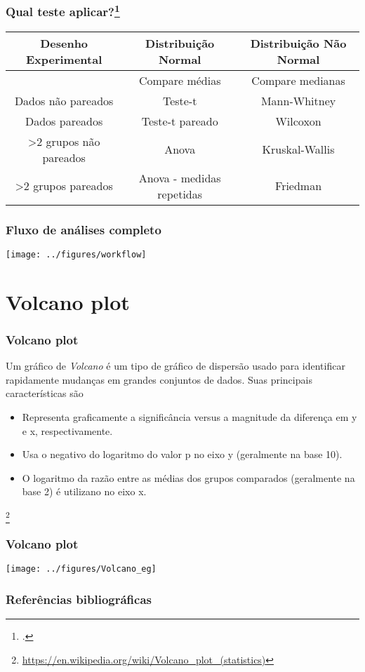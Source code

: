 \documentclass{beamer}
\newcommand\blfootnote[1]{%
  \begingroup
  \renewcommand\thefootnote{}\footnote{#1}%
  \addtocounter{footnote}{-1}%
  \endgroup
}
\begin{document}
\begin{frame}
\frametitle{Qual teste aplicar?\footcite{vinaixa2012guideline}}

\begin{table}[h]
\fontsize{9pt}{9pt}\selectfont
\centering
\begin{tabular}{ccc}
\hline
 Desenho Experimental & Distribuição Normal & Distribuição Não Normal    \\
\hline
 &  Compare médias & Compare medianas   \\
Dados não pareados & Teste-t & Mann-Whitney   \\
Dados pareados & Teste-t pareado & Wilcoxon \\
>2 grupos não pareados & Anova & Kruskal-Wallis \\
>2 grupos pareados & Anova - medidas repetidas & Friedman \\
\hline
\end{tabular}

\end{table}
\end{frame}

\begin{frame}
\frametitle{Fluxo de análises completo}

\begin{center}\texttt{[image: ../figures/workflow]} \end{center}
\end{frame}

\section{Volcano plot}
\begin{frame}
\frametitle{Volcano plot}
Um gráfico de \textit{Volcano} é um tipo de gráfico de dispersão usado para identificar rapidamente mudanças em grandes conjuntos de dados. Suas principais características são

\begin{itemize}
\item Representa graficamente a significância versus a magnitude da diferença em y e x, respectivamente.
\item Usa o negativo do logaritmo do valor p no eixo y (geralmente na base 10).
\item O logaritmo da razão entre as médias dos grupos comparados (geralmente na base 2) é utilizano no eixo x. 
\end{itemize}

\blfootnote{\url{https://en.wikipedia.org/wiki/Volcano_plot_(statistics)}}
\end{frame}

\begin{frame}
\frametitle{Volcano plot}

\begin{center}\texttt{[image: ../figures/Volcano\_eg]} \end{center}
\end{frame}

\begin{frame}
\frametitle{Referências bibliográficas}
\printbibliography
\end{frame}
\end{document}
